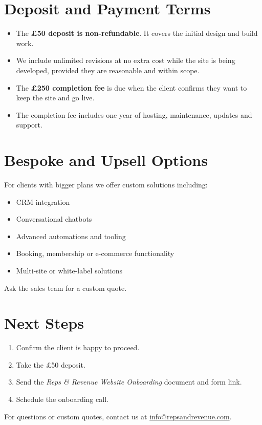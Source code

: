 \documentclass[11pt,a4paper]{article}
\begin{document}
\section{Deposit and Payment Terms}

\begin{itemize}[leftmargin=*]
    \item The \textbf{£50 deposit is non-refundable}. It covers the initial design and build work.
    \item We include unlimited revisions at no extra cost while the site is being developed, provided they are reasonable and within scope.
    \item The \textbf{£250 completion fee} is due when the client confirms they want to keep the site and go live.
    \item The completion fee includes one year of hosting, maintenance, updates and support.
\end{itemize}

\section{Bespoke and Upsell Options}

For clients with bigger plans we offer custom solutions including:

\begin{itemize}[leftmargin=*]
    \item CRM integration
    \item Conversational chatbots
    \item Advanced automations and tooling
    \item Booking, membership or e-commerce functionality
    \item Multi-site or white-label solutions
\end{itemize}

\noindent Ask the sales team for a custom quote.

\section{Next Steps}

\begin{enumerate}[leftmargin=*]
    \item Confirm the client is happy to proceed.
    \item Take the £50 deposit.
    \item Send the \textit{Reps \& Revenue Website Onboarding} document and form link.
    \item Schedule the onboarding call.
\end{enumerate}

\vfill
\begin{center}
    \color{brand-muted}\small
    For questions or custom quotes, contact us at \href{mailto:info@repsandrevenue.com}{info@repsandrevenue.com}.
\end{center}
\end{document}
